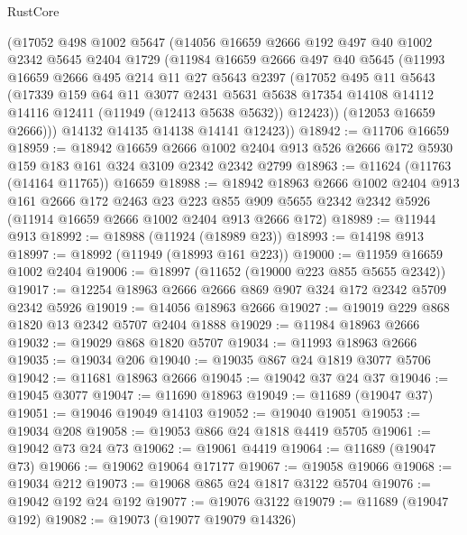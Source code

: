 \begin{lexlean}{RustCore}
\begin{coremodule}
    (@17052
      @498
      @1002
      @5647
      (@14056
        @16659
        @2666
        @192
        @497
        @40
        @1002
        @2342
        @5645
        @2404
        @1729
        (@11984
          @16659
          @2666
          @497
          @40
          @5645
          (@11993
            @16659
            @2666
            @495
            @214
            @11
            @27
            @5643
            @2397
            (@17052
              @495
              @11
              @5643
              (@17339
                @159
                @64
                @11
                @3077
                @2431
                @5631
                @5638
                @17354
                @14108
                @14112
                @14116
                @12411
                (@11949 (@12413 @5638 @5632))
                @12423))
            (@12053 @16659 @2666)))
        @14132
        @14135
        @14138
        @14141
        @12423))
@18942 := @11706 @16659
@18959 := @18942
    @16659
    @2666
    @1002
    @2404
    @913
    @526
    @2666
    @172
    @5930
    @159
    @183
    @161
    @324
    @3109
    @2342
    @2342
    @2799
@18963 := @11624 (@11763 (@14164 @11765)) @16659
@18988 := @18942
    @18963
    @2666
    @1002
    @2404
    @913
    @161
    @2666
    @172
    @2463
    @23
    @223
    @855
    @909
    @5655
    @2342
    @2342
    @5926
    (@11914 @16659 @2666 @1002 @2404 @913 @2666 @172)
@18989 := @11944 @913
@18992 := @18988 (@11924 (@18989 @23))
@18993 := @14198 @913
@18997 := @18992 (@11949 (@18993 @161 @223))
@19000 := @11959 @16659 @1002 @2404
@19006 := @18997 (@11652 (@19000 @223 @855 @5655 @2342))
@19017 := @12254 @18963 @2666 @2666 @869 @907 @324 @172 @2342 @5709 @2342 @5926
@19019 := @14056 @18963 @2666
@19027 := @19019 @229 @868 @1820 @13 @2342 @5707 @2404 @1888
@19029 := @11984 @18963 @2666
@19032 := @19029 @868 @1820 @5707
@19034 := @11993 @18963 @2666
@19035 := @19034 @206
@19040 := @19035 @867 @24 @1819 @3077 @5706
@19042 := @11681 @18963 @2666
@19045 := @19042 @37 @24 @37
@19046 := @19045 @3077
@19047 := @11690 @18963
@19049 := @11689 (@19047 @37)
@19051 := @19046 @19049 @14103
@19052 := @19040 @19051
@19053 := @19034 @208
@19058 := @19053 @866 @24 @1818 @4419 @5705
@19061 := @19042 @73 @24 @73
@19062 := @19061 @4419
@19064 := @11689 (@19047 @73)
@19066 := @19062 @19064 @17177
@19067 := @19058 @19066
@19068 := @19034 @212
@19073 := @19068 @865 @24 @1817 @3122 @5704
@19076 := @19042 @192 @24 @192
@19077 := @19076 @3122
@19079 := @11689 (@19047 @192)
@19082 := @19073 (@19077 @19079 @14326)

\end{coremodule}
\end{lexlean}
